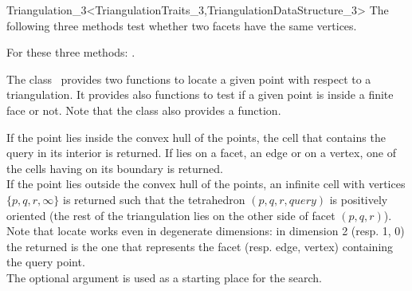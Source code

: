 \begin{ccRefClass}{Triangulation_3<TriangulationTraits_3,TriangulationDataStructure_3>}
The following three methods test whether two facets have the same
vertices.

{}
\ccGlue
{}
{}
\ccGlue
{}
{For these three methods: .}



The class \ccClassTemplateName\  provides two functions to locate
a given point with respect to a triangulation. It provides
also functions to test if a given point is inside a finite face
or not.  Note that the class  also
provides a  function.

{
If the point  lies inside the convex hull of the points, the cell 
that contains the query in its interior is returned. If  lies on a
facet, an edge or on a vertex, one of the cells having  on
its boundary is returned.\\ 
If the point  lies outside the convex hull of the points,
an infinite cell with vertices $\{ p, q, r, \infty\}$ is returned such that
the tetrahedron $( p, q, r, query )$ is positively oriented
(the rest of the triangulation lies on the other side of facet 
$( p, q, r )$). \\
Note that locate works even in degenerate dimensions: in dimension 2
(resp. 1, 0) the  returned is the one that represents
the facet (resp. edge, vertex) containing the query point. \\
The optional argument  is used as a starting place for the search.
}


\end{ccRefClass}
